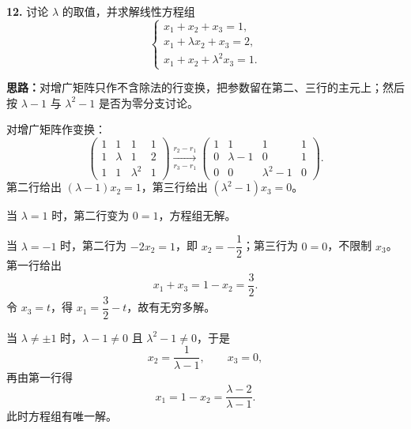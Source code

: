 \textbf{12.} 讨论 \(\lambda\) 的取值，并求解线性方程组
\[
\begin{cases}
x_1+x_2+x_3=1,\\
x_1+\lambda x_2+x_3=2,\\
x_1+x_2+\lambda^2x_3=1.
\end{cases}
\]

\ifshowsolutions%
\textbf{思路：}对增广矩阵只作不含除法的行变换，把参数留在第二、三行的主元上；然后按 \(\lambda-1\) 与 \(\lambda^2-1\) 是否为零分支讨论。

对增广矩阵作变换：
\[
\left(\begin{array}{ccc|c}
1&1&1&1\\1&\lambda&1&2\\1&1&\lambda^2&1
\end{array}\right)
\xrightarrow[r_3-r_1]{r_2-r_1}
\left(\begin{array}{ccc|c}
1&1&1&1\\0&\lambda-1&0&1\\0&0&\lambda^2-1&0
\end{array}\right).
\]
第二行给出 \((\lambda-1)x_2=1\)，第三行给出 \((\lambda^2-1)x_3=0\)。

当 \(\lambda=1\) 时，第二行变为 \(0=1\)，方程组无解。

当 \(\lambda=-1\) 时，第二行为 \(-2x_2=1\)，即 \(x_2=-\dfrac12\)；第三行为 \(0=0\)，不限制 \(x_3\)。第一行给出
\[
x_1+x_3=1-x_2=\frac32.
\]
令 \(x_3=t\)，得 \(x_1=\dfrac32-t\)，故有无穷多解。

当 \(\lambda\neq\pm1\) 时，\(\lambda-1\neq0\) 且 \(\lambda^2-1\neq0\)，于是
\[
x_2=\frac1{\lambda-1},\qquad x_3=0,
\]
再由第一行得
\[
x_1=1-x_2=\frac{\lambda-2}{\lambda-1}.
\]
此时方程组有唯一解。

\else \answerarea[10] \fi%
